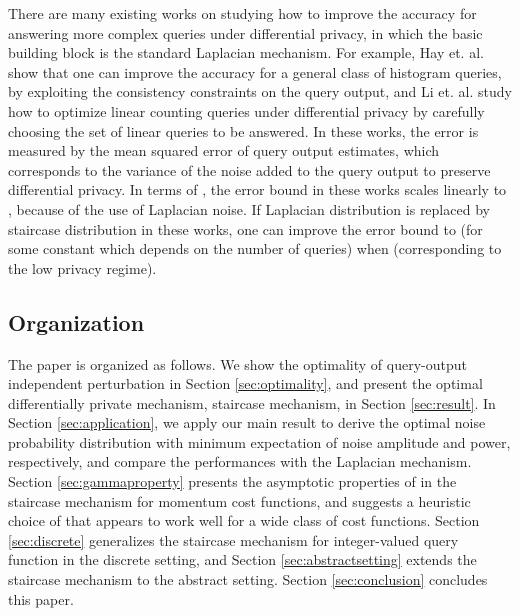 There are many existing works on studying how to improve the accuracy for answering more complex queries under differential privacy, in which the basic building block is the standard Laplacian mechanism. For example, Hay et. al. \cite{Hay10} show that  one can improve the accuracy for a general class of histogram queries, by exploiting the consistency constraints on the query output, and Li et. al. \cite{Li10}  study how to optimize linear counting queries under differential privacy by carefully choosing the set of linear queries to be answered. In these works, the error is measured by the mean squared error of query output estimates, which corresponds to the variance of the noise added to the query output to preserve differential privacy. In terms of , the error bound in these works scales linearly to , because of the use of Laplacian noise. If Laplacian distribution is replaced by staircase distribution in these works, one can improve the error bound to  (for some constant  which depends on the number of queries) when  (corresponding to the low privacy regime).










\subsection{Organization}

The paper is organized as follows. We show the optimality of query-output independent perturbation in Section \ref{sec:optimality}, and present the optimal differentially private mechanism, staircase mechanism, in Section \ref{sec:result}. In Section \ref{sec:application}, we apply our main result to derive the optimal noise probability distribution with minimum expectation of noise amplitude and power, respectively, and  compare the performances with the Laplacian mechanism.  Section \ref{sec:gammaproperty} presents the asymptotic properties of  in the staircase mechanism for momentum cost functions, and suggests a heuristic choice of  that appears to work well for a wide class of cost functions. Section \ref{sec:discrete} generalizes the staircase mechanism for integer-valued query function in the discrete setting, and Section \ref{sec:abstractsetting} extends the staircase mechanism to the abstract setting. Section \ref{sec:conclusion} concludes this paper.






